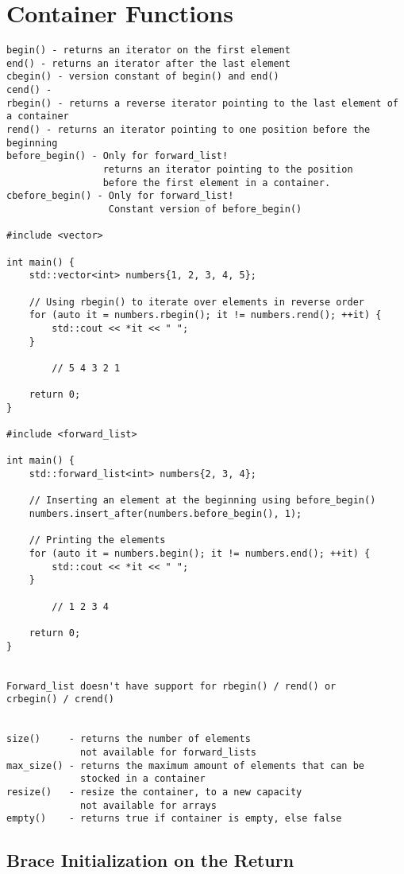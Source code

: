 \documentclass[openany]{report}
\begin{document}
\section{Container Functions}

\begin{verbatim}
begin() - returns an iterator on the first element 
end() - returns an iterator after the last element
cbegin() - version constant of begin() and end()
cend() - 
rbegin() - returns a reverse iterator pointing to the last element of a container
rend() - returns an iterator pointing to one position before the beginning
before_begin() - Only for forward_list! 
                 returns an iterator pointing to the position
                 before the first element in a container.  
cbefore_begin() - Only for forward_list!
                  Constant version of before_begin()

#include <vector>

int main() {
    std::vector<int> numbers{1, 2, 3, 4, 5};

    // Using rbegin() to iterate over elements in reverse order
    for (auto it = numbers.rbegin(); it != numbers.rend(); ++it) {
        std::cout << *it << " ";
    }

        // 5 4 3 2 1

    return 0;
}

#include <forward_list>

int main() {
    std::forward_list<int> numbers{2, 3, 4};

    // Inserting an element at the beginning using before_begin()
    numbers.insert_after(numbers.before_begin(), 1);

    // Printing the elements
    for (auto it = numbers.begin(); it != numbers.end(); ++it) {
        std::cout << *it << " ";
    }
    
        // 1 2 3 4

    return 0;
}


Forward_list doesn't have support for rbegin() / rend() or
crbegin() / crend()


size()     - returns the number of elements
             not available for forward_lists
max_size() - returns the maximum amount of elements that can be
             stocked in a container
resize()   - resize the container, to a new capacity
             not available for arrays
empty()    - returns true if container is empty, else false
\end{verbatim}

\subsection{Brace Initialization on the Return}
\end{document}
